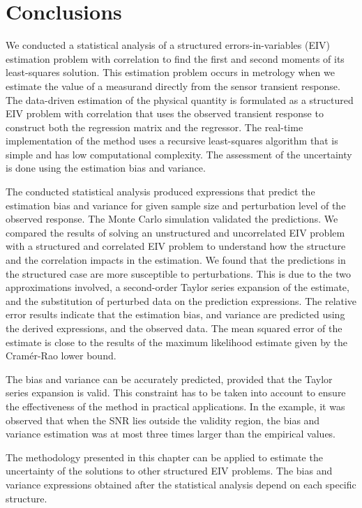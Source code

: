 \color{black}


\section{Conclusions}

We conducted a statistical analysis of a structured errors-in-variables (EIV) estimation problem with correlation to find the first and second moments of its least-squares solution.
This estimation problem occurs in metrology when we estimate the value of a measurand directly from the sensor transient response.
The data-driven estimation of the physical quantity is formulated as a structured EIV problem with correlation that uses the observed transient response to construct both the regression matrix and the regressor.
The real-time implementation of the method uses a recursive least-squares algorithm that is simple and has low computational complexity.
The assessment of the uncertainty is done using the estimation bias and variance.

The conducted statistical analysis produced expressions that predict the estimation bias and variance for given sample size and perturbation level of the observed response.
The Monte Carlo simulation validated the predictions.
We compared the results of solving an unstructured and uncorrelated EIV problem with a structured and correlated EIV problem to understand how the structure and the correlation impacts in the estimation.
We found that the predictions in the structured case are more susceptible to perturbations.
This is due to the two approximations involved, a second-order Taylor series expansion of the estimate, and the substitution of perturbed data on the prediction expressions.
The relative error results indicate that the estimation bias, and variance are predicted using the derived expressions, and the observed data.
The mean squared error of the estimate is close to the results of the maximum likelihood estimate given by the Cram\'er-Rao lower bound.

The bias and variance can be accurately predicted, provided that the Taylor series expansion is valid.
This constraint has to be taken into account to ensure the effectiveness of the method in practical applications.
In the example, it was observed that when the SNR lies outside the validity region, the bias and variance estimation was at most three times larger than the empirical values.

The methodology presented in this chapter can be applied to estimate the uncertainty of the solutions to other structured EIV problems.
The bias and variance expressions obtained after the statistical analysis depend on each specific structure.


